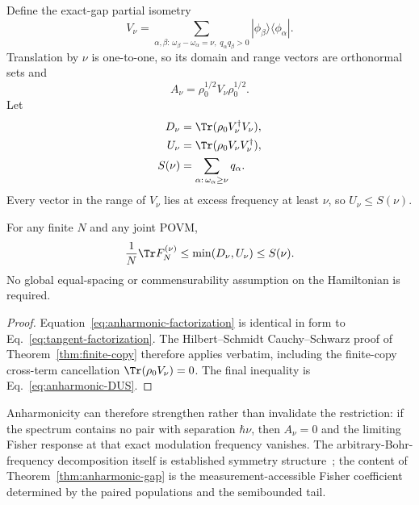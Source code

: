 Define the exact-gap partial isometry
\begin{equation}
 V_\nu=\sum_{\alpha,\beta:\,
 \omega_\beta-\omega_\alpha=\nu,\;q_\alpha q_\beta>0}
 |\phi_\beta\rangle\langle\phi_\alpha|.
 \label{eq:anharmonic-V}
\end{equation}
Translation by $\nu$ is one-to-one, so its domain and range vectors are orthonormal sets and
\begin{equation}
 A_\nu=\rho_0^{1/2}V_\nu\rho_0^{1/2}.
 \label{eq:anharmonic-factorization}
\end{equation}
Let
\begin{align}
 D_\nu&=\Tr(\rho_0V_\nu^\dagger V_\nu),\\
 U_\nu&=\Tr(\rho_0V_\nu V_\nu^\dagger),\\
 S(\nu)&=\sum_{\alpha:\,\omega_\alpha\geq\nu}q_\alpha.
 \label{eq:anharmonic-DUS}
\end{align}
Every vector in the range of $V_\nu$ lies at excess frequency at least $\nu$, so $U_\nu\leq S(\nu)$.

\begin{theorem}
\label{thm:anharmonic-gap}
For any finite $N$ and any joint POVM,
\begin{equation}
 \frac1N\Tr F_N^{(\nu)}
 \leq\min(D_\nu,U_\nu)
 \leq S(\nu).
 \label{eq:anharmonic-bound}
\end{equation}
No global equal-spacing or commensurability assumption on the Hamiltonian is required.
\end{theorem}

\begin{proof}
Equation~\eqref{eq:anharmonic-factorization} is identical in form to Eq.~\eqref{eq:tangent-factorization}.  The Hilbert--Schmidt Cauchy--Schwarz proof of Theorem~\ref{thm:finite-copy} therefore applies verbatim, including the finite-copy cross-term cancellation $\Tr(\rho_0V_\nu)=0$.  The final inequality is Eq.~\eqref{eq:anharmonic-DUS}.
\end{proof}

Anharmonicity can therefore strengthen rather than invalidate the restriction: if the spectrum contains no pair with separation $\hbar\nu$, then $A_\nu=0$ and the limiting Fisher response at that exact modulation frequency vanishes.  The arbitrary-Bohr-frequency decomposition itself is established symmetry structure~\cite{MarvianSpekkens2014Modes}; the content of Theorem~\ref{thm:anharmonic-gap} is the measurement-accessible Fisher coefficient determined by the paired populations and the semibounded tail.

